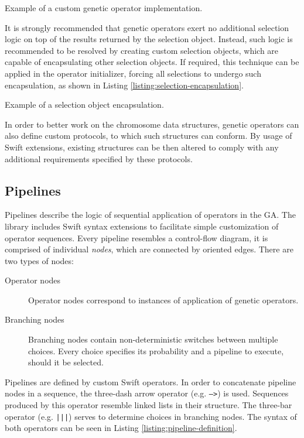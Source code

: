\begin{listing}[ht]
	\caption{Example of a custom genetic operator implementation.}
	\label{listing:custom-operator}
\end{listing}

It is strongly recommended that genetic operators exert no additional selection logic on top of the results returned by the selection object. Instead, such logic is recommended to be resolved by creating custom selection objects, which are capable of encapsulating other selection objects. If required, this technique can be applied in the operator initializer, forcing all selections to undergo such encapsulation, as shown in Listing \ref{listing:selection-encapsulation}.

\begin{listing}[ht]
	\caption{Example of a selection object encapsulation.}
	\label{listing:selection-encapsulation}
\end{listing}

In order to better work on the chromosome data structures, genetic operators can also define custom protocols, to which such structures can conform. By usage of Swift extensions, existing structures can be then altered to comply with any additional requirements specified by these protocols.

\subsection{Pipelines}\label{section:pipelines}
Pipelines describe the logic of sequential application of operators in the GA. The library includes Swift syntax extensions to facilitate simple customization of operator sequences. Every pipeline resembles a control-flow diagram, it is comprised of individual \textit{nodes}, which are connected by oriented edges. There are two types of nodes:
~
\begin{description}
	\item[Operator nodes]
	Operator nodes correspond to instances of application of genetic operators.

	\item[Branching nodes]
	Branching nodes contain non-deterministic switches between multiple choices. Every choice specifies its probability and a pipeline to execute, should it be selected.
\end{description}

Pipelines are defined by custom Swift operators. In order to concatenate pipeline nodes in a sequence, the three-dash arrow operator (e.g. \texttt{--->}) is used. Sequences produced by this operator resemble linked lists in their structure. The three-bar operator (e.g. \texttt{|||}) serves to determine choices in branching nodes. The syntax of both operators can be seen in Listing \ref{listing:pipeline-definition}.

